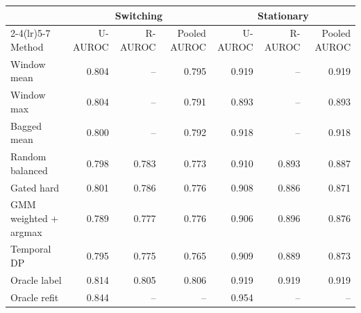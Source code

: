 \begin{tabular}{lrrrrrr}
\toprule
& \multicolumn{3}{c}{Switching} & \multicolumn{3}{c}{Stationary} \\
\cmidrule(lr){2-4}\cmidrule(lr){5-7}
Method & U-AUROC & R-AUROC & Pooled AUROC & U-AUROC & R-AUROC & Pooled AUROC \\
\midrule
Window mean & 0.804 & -- & 0.795 & 0.919 & -- & 0.919 \\
Window max & 0.804 & -- & 0.791 & 0.893 & -- & 0.893 \\
Bagged mean & 0.800 & -- & 0.792 & 0.918 & -- & 0.918 \\
Random balanced & 0.798 & 0.783 & 0.773 & 0.910 & 0.893 & 0.887 \\
Gated hard & 0.801 & 0.786 & 0.776 & 0.908 & 0.886 & 0.871 \\
GMM weighted + argmax & 0.789 & 0.777 & 0.776 & 0.906 & 0.896 & 0.876 \\
Temporal DP & 0.795 & 0.775 & 0.765 & 0.909 & 0.889 & 0.873 \\
Oracle label & 0.814 & 0.805 & 0.806 & 0.919 & 0.919 & 0.919 \\
Oracle refit & 0.844 & -- & -- & 0.954 & -- & -- \\
\bottomrule
\end{tabular}
